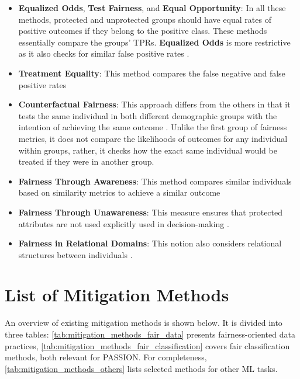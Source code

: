 \documentclass[12pt, a4paper, oneside]{book}   	%
\begin{document}
\begin{appendices}
\begin{itemize}
				\item \textbf{Equalized Odds}, \textbf{Test Fairness}, and \textbf{Equal Opportunity}: In all these methods, protected and unprotected groups should have equal rates of positive outcomes if they belong to the positive class. These methods essentially compare the groups' \glspl{TPR}. \textbf{Equalized Odds} is more restrictive as it also checks for similar false positive rates \autocite{M149_Verma_2018,Mehrabi_2021}.
				
				\item \textbf{Treatment Equality}: This method compares the false negative and false positive rates \autocite{M151_Wang_2014}
				
				\item \textbf{Counterfactual Fairness}: This approach differs from the others in that it tests the same individual in both different demographic groups with the intention of achieving the same outcome \autocite{M87_Kusner_2017,Mehrabi_2021}. Unlike the first group of fairness metrics, it does not compare the likelihoods of outcomes for any individual within groups, rather, it checks how the exact same individual would be treated if they were in another group.
				
				\item \textbf{Fairness Through Awareness}: This method compares similar individuals based on similarity metrics to achieve a similar outcome \autocite{M48_Dwork_2012,Mehrabi_2021}
				
				\item \textbf{Fairness Through Unawareness}: This measure ensures that protected attributes are not used explicitly used in decision-making \autocite{M61_Grgic-Hlaca_2016, M87_Kusner_2017}.
				
				\item \textbf{Fairness in Relational Domains}: This notion also considers relational structures between individuals \autocite{M50_Farnadi_2018}.
			\end{itemize}
			
			\chapter{List of Mitigation Methods} \label{app:mitigationMethods}
			An overview of existing mitigation methods is shown below. It is divided into three tables: \autoref{tab:mitigation_methods_fair_data} presents fairness-oriented data practices, \autoref{tab:mitigation_methods_fair_classification} covers fair classification methods, both relevant for PASSION. For completeness, \autoref{tab:mitigation_methods_others} lists selected methods for other \gls{ML} tasks.
			

\end{appendices}
\end{document}

